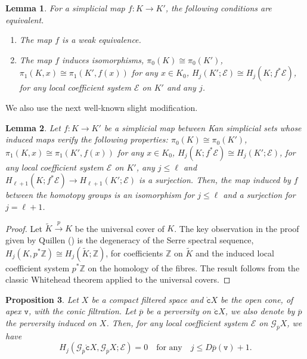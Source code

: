 \documentclass[a4paper,10pt,english,reqno]{amsart}
\theoremstyle{plain}
\newtheorem{proposition}{Proposition}[section]
\newtheorem{lemma}[proposition]{Lemma}
\theoremstyle{definition}
\theoremstyle{remark}
\numberwithin{equation}{section}
\def\ov{\overline}
\def\cE{{\mathcal E}}
\def\crG{{\mathscr G}}
\def\tc{{\mathtt c}}
\def\tv{{\mathtt v}}
\def\Z{\mathbb{Z}}
\def\rc{{\mathring{\tc}}}
\renewcommand\1{\hbox{\ding{192}}}
\renewcommand\2{\hbox{\ding{193}}}
\newcommand\3{\hbox{\ding{194}}}
\newcommand\4{\hbox{\ding{195}}}
\begin{document}
\begin{lemma}\label{lem:quillen}
For a simplicial map $f\colon K\to K'$, the following conditions are equivalent. 
\begin{enumerate}
\item The map $f$ is a weak equivalence.
\item The map $f$ induces isomorphisms, $\pi_{0}(K)\cong \pi_{0}(K')$, $\pi_{1}(K,x)\cong \pi_{1}(K',f(x))$ 
for any $x\in K_{0}$,
$H_{j}(K';\cE)\cong H_{j}(K;f^*\cE)$, for any local coefficient system $\cE$  on $K'$ and any $j$.
\end{enumerate} 
\end{lemma}

We  also use the next well-known  slight modification.


%
\begin{lemma}\label{lem:quillenfini}
Let $f\colon K\to K'$ be a simplicial map between Kan simplicial sets whose induced maps verify the following properties:
$\pi_{0}(K)\cong \pi_{0}(K')$, $\pi_{1}(K,x)\cong \pi_{1}(K',f(x))$ for any $x\in K_{0}$,
$H_{j}(K;f^*\cE)\cong H_{j}(K';\cE)$, for 
any local coefficient system $\cE$ on $K'$, 
 any $j\leq \ell$ and
$H_{\ell+1}(K;f^*\cE)\to H_{\ell+1}(K';\cE)$ is a surjection.
Then, the map induced by $f$ between the  homotopy groups is an isomorphism 
for $j\leq \ell$ and a surjection for $j=\ell+1$.
\end{lemma}


\begin{proof}
Let $\widetilde{K}\xrightarrow{p} K$ be the universal cover  of $K$.
The key observation in the proof given by Quillen (\cite{MR0223432}) is the degeneracy of the Serre spectral sequence,
$H_{j}(K,{p}^*\Z)\cong H_{j}(\widetilde{K};\Z)$,
for coefficients $\Z$ on $\widetilde{K}$ and the induced local coefficient system $p^*\Z$ on the homology of the fibres.
The result follows from the classic Whitehead theorem applied to the universal covers.
\end{proof}



%
\begin{proposition}\label{prop:cone}
Let $X$ be a compact filtered space 
 and $\rc X$ be the open cone, of apex $\tv$, with the conic filtration.
Let $\ov{p}$ be a   perversity on $\rc X$,  
we also denote  by $\ov{p}$ the perversity induced on $X$.
%
Then, for any local coefficient system $\cE$ on $\crG_{\ov{p}}X$, we have
\begin{equation}\label{equa:conegajer}
H_{j}(\crG_{\ov{p}}\rc X, \crG_{\ov{p}} X ;\cE ) =
0\quad\text{for any}\quad j\leq D\ov{p}(\tv)+1.
\end{equation}
%
\end{proposition}
\end{document}
